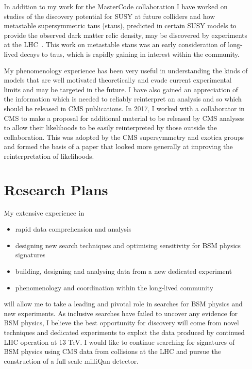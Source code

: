 \documentclass[11pt]{article}
\theoremstyle{plain} \numberwithin{equation}{section}
\theoremstyle{definition}
\begin{document}
In addition to my work for the MasterCode collaboration I have worked on 
studies of the discovery potential for SUSY at future colliders and how 
metastable supersymmetric taus (staus), predicted in certain SUSY models to provide the observed
dark matter relic density, may be discovered by experiments at the LHC~\cite{Citron:2012fg}. 
This work on metastable staus was an early consideration of long-lived decays to taus, which
is rapidly gaining in interest within the community.

My phenomenology experience has been very useful in understanding
the kinds of models that are well motivated theoretically and evade current experimental limits and may be targeted in the 
future. I have also gained an appreciation
of the information which is needed to reliably reinterpret an analysis and so which should be released in CMS publications.
In 2017, I worked with a collaborator in CMS to make a proposal 
for additional material to be released by CMS analyses
to allow their likelihoods to be easily reinterpreted by those outside the collaboration. This was adopted by the CMS
supersymmetry and exotica groups and formed the basis of a paper that looked more generally at improving
the reinterpretation of likelihoods.

\section*{Research Plans}

My extensive experience in

\begin{itemize}
\item rapid data comprehension and analysis
\item designing new search techniques and optimising sensitivity for BSM physics signatures
\item building, designing and analysing data from a new dedicated experiment
\item phenomenology and coordination within the long-lived community
\end{itemize}

\noindent will allow me to take a leading and pivotal role in searches for BSM physics and new experiments.
As inclusive searches have failed to uncover any evidence for BSM physics, 
I believe the best opportunity for discovery will 
come from novel techniques and dedicated experiments to exploit the data produced
by continued LHC operation at 13 TeV.  I would like to continue searching for 
signatures of BSM physics using CMS data from collisions at the LHC
and pursue the construction of a full scale milliQan detector.
\end{document}
